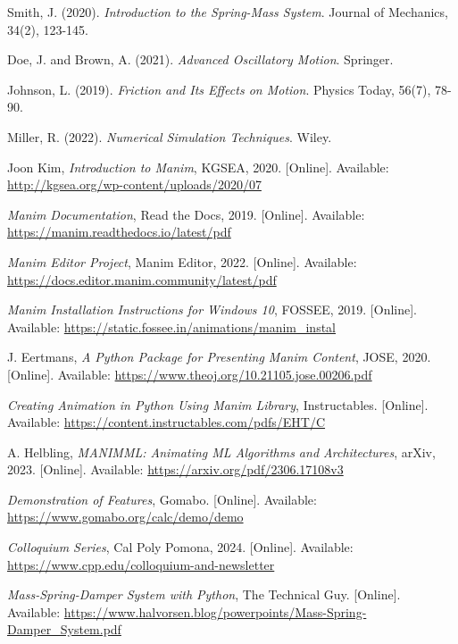 \documentclass[12pt, a4paper, oneside]{report}
\begin{document}
\begin{thebibliography}{99} %

	Smith, J. (2020). \textit{Introduction to the Spring-Mass System}. Journal of Mechanics, 34(2), 123-145.

	Doe, J. and Brown, A. (2021). \textit{Advanced Oscillatory Motion}. Springer.

	Johnson, L. (2019). \textit{Friction and Its Effects on Motion}. Physics Today, 56(7), 78-90.

	Miller, R. (2022). \textit{Numerical Simulation Techniques}. Wiley.

	Joon Kim, \textit{Introduction to Manim}, KGSEA, 2020. [Online]. Available: \url{http://kgsea.org/wp-content/uploads/2020/07}

	\textit{Manim Documentation}, Read the Docs, 2019. [Online]. Available: \url{https://manim.readthedocs.io/latest/pdf}

	\textit{Manim Editor Project}, Manim Editor, 2022. [Online]. Available: \url{https://docs.editor.manim.community/latest/pdf}

	\textit{Manim Installation Instructions for Windows 10}, FOSSEE, 2019. [Online]. Available: \url{https://static.fossee.in/animations/manim_instal}

	J. Eertmans, \textit{A Python Package for Presenting Manim Content}, JOSE, 2020. [Online]. Available: \url{https://www.theoj.org/10.21105.jose.00206.pdf}

	\textit{Creating Animation in Python Using Manim Library}, Instructables. [Online]. Available: \url{https://content.instructables.com/pdfs/EHT/C}

	A. Helbling, \textit{MANIMML: Animating ML Algorithms and Architectures}, arXiv, 2023. [Online]. Available: \url{https://arxiv.org/pdf/2306.17108v3}

	\textit{Demonstration of Features}, Gomabo. [Online]. Available: \url{https://www.gomabo.org/calc/demo/demo}

	\textit{Colloquium Series}, Cal Poly Pomona, 2024. [Online]. Available: \url{https://www.cpp.edu/colloquium-and-newsletter}

	\textit{Mass-Spring-Damper System with Python}, The Technical Guy. [Online]. Available: \url{https://www.halvorsen.blog/powerpoints/Mass-Spring-Damper_System.pdf}


\end{thebibliography}
\end{document}
